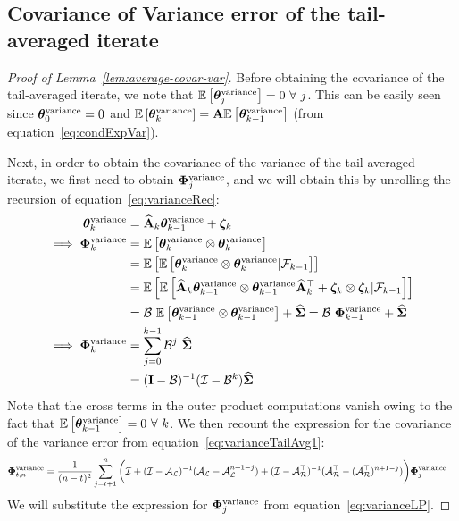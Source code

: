 \subsection{Covariance of Variance error of the tail-averaged iterate}
\begin{proof}[Proof of Lemma~\ref{lem:average-covar-var}]
Before obtaining the covariance of the tail-averaged iterate, we note that  $\E{\thetav_j^{\text{variance}}}=0\ \forall\ j$. This can be easily seen since $\boldsymbol{\theta}_0^{\textrm{variance}}=0$ and $\mathbb{E}\left[\boldsymbol{\theta}_k^{\textrm{variance}}\right]=\mathbf{A}\mathbb{E}\left[\boldsymbol{\theta}_{k-1}^{\textrm{variance}}\right]$ (from equation~\ref{eq:condExpVar}).

Next, in order to obtain the covariance of the variance of the tail-averaged iterate, we first need to obtain $\boldsymbol{\Phi}_j^{\text{variance}}$, and we will obtain this by unrolling the recursion of equation~\ref{eq:varianceRec}:
\begin{align}
\label{eq:varianceLP}
\thetav_k^{\text{variance}}&= \Ah_k\thetav_{k-1}^{\text{variance}}+\zetav_k\nonumber\\
\implies \phiv_{k}^{\text{variance}} &=\E{\thetav_k^{\text{variance}}\otimes\thetav_k^{\text{variance}}}\nonumber\\
&=\E{\E{\thetav_k^{\text{variance}}\otimes\thetav_k^{\text{variance}}|\mathcal{F}_{k-1}}}\nonumber\\
&=\E{\E{\Ah_k\thetav_{k-1}^{\text{variance}}\otimes\thetav_{k-1}^{\text{variance}}\Ah_k\T+\zetav_k\otimes\zetav_k|\mathcal{F}_{k-1}}}\nonumber\\
&=\BT\ \E{\thetav_{k-1}^{\text{variance}}\otimes\thetav_{k-1}^{\text{variance}}}+\Sigh=\BT\ \phiv_{k-1}^{\text{variance}}+\Sigh\nonumber\\
\implies\phiv_{k}^{\text{variance}}&=\sum_{j=0}^{k-1}\BT^j\ \Sigh\nonumber\\
&=(\eye-\BT)^{-1}(\eyeT-\BT^k)\Sigh
\end{align}
Note that the cross terms in the outer product computations vanish owing to the fact that $\E{\thetav_{k-1}^{\textrm{variance}}}=0\ \forall\ k$. We then recount the expression for the covariance of the variance error from equation~\ref{eq:varianceTailAvg1}:
\begin{align*}
\boldsymbol{\bar{\Phi}}_{t,n}^{\text{variance}}&=\frac{1}{(n-t)^2}\sum_{j=t+1}^n\bigg( \mathcal{I} + (\mathcal{I}-\mathcal{A}_{\mathcal{L}})^{-1}(\mathcal{A}_{\mathcal{L}}-\mathcal{A}_{\mathcal{L}}^{n+1-j}) + (\mathcal{I}-\mathcal{A}_{\mathcal{R}}^{\top})^{-1}(\mathcal{A}_{\mathcal{R}}^{\top}-(\mathcal{A}_{\mathcal{R}}^{\top})^{n+1-j}) \bigg)\boldsymbol{\Phi}_j^{\text{variance}}
\end{align*}
We will substitute the expression for $\boldsymbol{\Phi}_j^{\text{variance}}$ from equation~\ref{eq:varianceLP}.

\end{proof}
